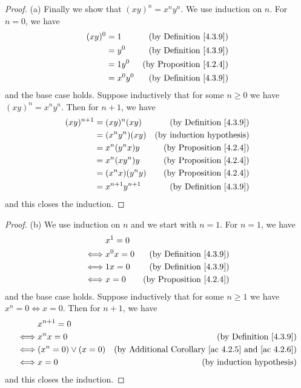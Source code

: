 \begin{proof}{(a)}
    Finally we show that \((xy)^n = x^n y^n\).
    We use induction on \(n\).
    For \(n = 0\), we have
    \begin{align*}
        (xy)^0 & = 1       & \text{(by Definition \ref{4.3.9})}  \\
               & = y^0     & \text{(by Definition \ref{4.3.9})}  \\
               & = 1y^0    & \text{(by Proposition \ref{4.2.4})} \\
               & = x^0 y^0 & \text{(by Definition \ref{4.3.9})}
    \end{align*}
    and the base case holds.
    Suppose inductively that for some \(n \geq 0\) we have \((xy)^n = x^n y^n\).
    Then for \(n + 1\), we have
    \begin{align*}
        (xy)^{n + 1} & = (xy)^n (xy)         & \text{(by Definition \ref{4.3.9})}  \\
                     & = (x^n y^n) (xy)      & \text{(by induction hypothesis)}    \\
                     & = x^n (y^n x) y       & \text{(by Proposition \ref{4.2.4})} \\
                     & = x^n (x y^n) y       & \text{(by Proposition \ref{4.2.4})} \\
                     & = (x^n x)(y^n y)      & \text{(by Proposition \ref{4.2.4})} \\
                     & = x^{n + 1} y^{n + 1} & \text{(by Definition \ref{4.3.9})}
    \end{align*}
    and this closes the induction.
\end{proof}

\begin{proof}{(b)}
    We use induction on \(n\) and we start with \(n = 1\).
    For \(n = 1\), we have
    \begin{align*}
             & x^1 = 0                                         \\
        \iff & x^0 x = 0 & \text{(by Definition \ref{4.3.9})}  \\
        \iff & 1x = 0    & \text{(by Definition \ref{4.3.9})}  \\
        \iff & x = 0     & \text{(by Proposition \ref{4.2.4})}
    \end{align*}
    and the base case holds.
    Suppose inductively that for some \(n \geq 1\) we have \(x^n = 0 \iff x = 0\).
    Then for \(n + 1\), we have
    \begin{align*}
             & x^{n + 1} = 0                                                                               \\
        \iff & x^n x = 0              & \text{(by Definition \ref{4.3.9})}                                 \\
        \iff & (x^n = 0) \lor (x = 0) & \text{(by Additional Corollary \ref{ac 4.2.5} and \ref{ac 4.2.6})} \\
        \iff & x = 0                  & \text{(by induction hypothesis)}
    \end{align*}
    and this closes the induction.
\end{proof}

